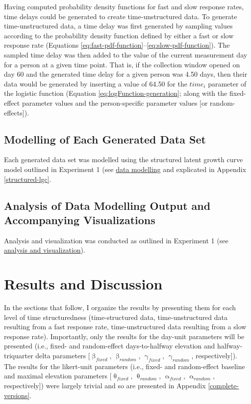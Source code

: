 \documentclass[
12pt, %
twoside,
english]{guelphthesis}
\begin{document}
Having computed probability density functions for fast and slow response rates, time delays could be generated to create time-unstructured data. To generate time-unstructured data, a time delay was first
generated by sampling values according to the probability density function defined by either a fast or slow response rate (Equations \ref{eq:fast-pdf-function}--\ref{eq:slow-pdf-function}). The sampled time delay was then added to the value of the current measurement day for a person at a given time point. That is, if the collection window opened on day 60 and the generated time delay for a given person was 4.50 days, then their data would be generated by inserting a value of 64.50 for the \(time_i\) parameter of the logistic function (Equation \ref{eq:logFunction-generation}; along with the fixed-effect parameter values and the person-specific parameter values {[}or random-effects{]}).

\hypertarget{data-modelling-exp3}{%
\subsection{Modelling of Each Generated Data Set}\label{data-modelling-exp3}}

Each generated data set was modelled using the structured latent growth curve model outlined in Experiment 1 (see \protect\hyperlink{data-modelling}{data modelling} and explicated in Appendix \ref{structured-lgc}.

\hypertarget{analysis-of-data-modelling-output-and-accompanying-visualizations-1}{%
\subsection{Analysis of Data Modelling Output and Accompanying Visualizations}\label{analysis-of-data-modelling-output-and-accompanying-visualizations-1}}

Analysis and visualization was conducted as outlined in Experiment 1 (see \protect\hyperlink{analysis-visualization}{analysis and visualization}).

\hypertarget{results-and-discussion-2}{%
\section{Results and Discussion}\label{results-and-discussion-2}}

In the sections that follow, I organize the results by presenting them for each level of time structuredness (time-structured data, time-unstructured data resulting from a fast response rate, time-unstructured data resulting from a slow response rate). Importantly, only the results for the day-unit parameters will be presented (i.e., fixed- and random-effect days-to-halfway elevation and halfway-triquarter delta parameters {[}\(\upbeta_{fixed}\), \(\upbeta_{random}\), \(\upgamma_{fixed}\), \(\upgamma_{random}\), respectively{]}). The results for the likert-unit parameters (i.e., fixed- and random-effect baseline and maximal elevation parameters {[}\(\uptheta_{fixed}\), \(\uptheta_{random}\), \(\upalpha_{fixed}\), \(\upalpha_{random}\), respectively{]}) were largely trivial and so are presented in Appendix \ref{complete-versions}.
\end{document}
